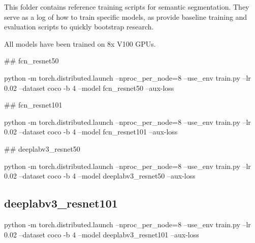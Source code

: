 This folder contains reference training scripts for semantic segmentation. They serve as a log of how to train specific models, as provide baseline training and evaluation scripts to quickly bootstrap research.

All models have been trained on 8x V100 G\+P\+Us.

\#\# fcn\+\_\+resnet50 
\begin{DoxyCode}
python -m torch.distributed.launch --nproc\_per\_node=8 --use\_env train.py --lr 0.02 --dataset coco -b 4
       --model fcn\_resnet50 --aux-loss
\end{DoxyCode}


\#\# fcn\+\_\+resnet101 
\begin{DoxyCode}
python -m torch.distributed.launch --nproc\_per\_node=8 --use\_env train.py --lr 0.02 --dataset coco -b 4
       --model fcn\_resnet101 --aux-loss
\end{DoxyCode}


\#\# deeplabv3\+\_\+resnet50 
\begin{DoxyCode}
python -m torch.distributed.launch --nproc\_per\_node=8 --use\_env train.py --lr 0.02 --dataset coco -b 4
       --model deeplabv3\_resnet50 --aux-loss
\end{DoxyCode}


\subsection*{deeplabv3\+\_\+resnet101}


\begin{DoxyCode}
python -m torch.distributed.launch --nproc\_per\_node=8 --use\_env train.py --lr 0.02 --dataset coco -b 4
       --model deeplabv3\_resnet101 --aux-loss
\end{DoxyCode}
 